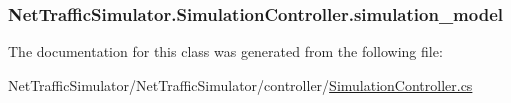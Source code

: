 \hypertarget{classNetTrafficSimulator_1_1SimulationController_a26441a135203881caae479f93f17e288}{
\subsubsection[{simulation\-\_\-model}]{ Net\-Traffic\-Simulator.\-Simulation\-Controller.\-simulation\-\_\-model\hspace{0.3cm}{\ttfamily [private]}}}\label{classNetTrafficSimulator_1_1SimulationController_a26441a135203881caae479f93f17e288}


The documentation for this class was generated from the following file\-:\begin{DoxyCompactItemize}
\item 
Net\-Traffic\-Simulator/\-Net\-Traffic\-Simulator/controller/\hyperlink{SimulationController_8cs}{Simulation\-Controller.\-cs}\end{DoxyCompactItemize}
